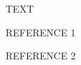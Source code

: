 \documentclass[gmd, manuscript]{copernicus}
\begin{document}


\appendixfigures  %

\appendixtables   %







\begin{acknowledgements}
TEXT
\end{acknowledgements}






\begin{thebibliography}{}

REFERENCE 1

REFERENCE 2

\end{thebibliography}



\end{document}
